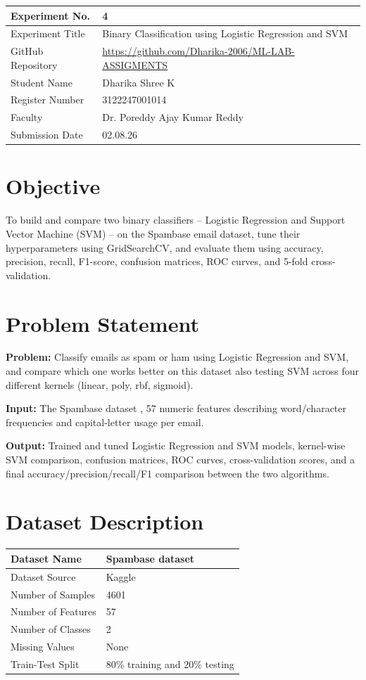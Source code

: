 \documentclass[12pt,a4paper]{article}
\begin{document}
\begin{tabular}{|p{4cm}|p{11cm}|}
\hline
Experiment No. & 4\\ \hline
Experiment Title & Binary Classification using Logistic Regression and SVM\\ \hline
GitHub Repository & \url{https://github.com/Dharika-2006/ML-LAB-ASSIGMENTS} \\ \hline
Student Name & Dharika Shree K\\ \hline
Register Number & 3122247001014\\ \hline
Faculty & Dr. Poreddy Ajay Kumar Reddy \\ \hline
Submission Date & 02.08.26\\ \hline
\end{tabular}
\section{Objective}
To build and compare two binary classifiers -- Logistic Regression and Support Vector Machine (SVM) -- on the Spambase email dataset, tune their hyperparameters using GridSearchCV, and evaluate them using accuracy, precision, recall, F1-score, confusion matrices, ROC curves, and 5-fold cross-validation.

\section{Problem Statement}
\textbf{Problem:} Classify emails as spam or ham  using Logistic Regression and SVM, and compare which one works better on this dataset also testing SVM across four different kernels (linear, poly, rbf, sigmoid).

\textbf{Input:} The Spambase dataset , 57 numeric features describing word/character frequencies and capital-letter usage per email.

\textbf{Output:} Trained and tuned Logistic Regression and SVM models, kernel-wise SVM comparison, confusion matrices, ROC curves, cross-validation scores, and a final accuracy/precision/recall/F1 comparison between the two algorithms.

\section{Dataset Description}
\begin{longtable}{|p{6cm}|p{8cm}|}
\hline
Dataset Name & Spambase dataset\\ \hline
Dataset Source & Kaggle\\ \hline
Number of Samples & 4601\\ \hline
Number of Features & 57 \\ \hline
Number of Classes & 2 \\ \hline
Missing Values & None \\ \hline
Train-Test Split & 80\% training and 20\% testing\\ \hline
\end{longtable}
\end{document}
